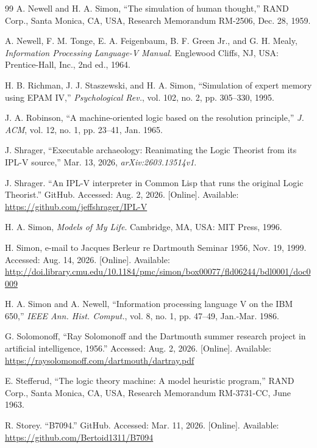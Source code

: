 \documentclass[journal]{IEEEtran}
\begin{document}
\begin{thebibliography}{99}
 A. Newell and H. A. Simon,
  ``The simulation of human thought,''
  RAND Corp., Santa Monica, CA, USA,
  Research Memorandum RM-2506, Dec. 28, 1959.

 A. Newell, F. M. Tonge, E. A. Feigenbaum,
  B. F. Green Jr., and G. H. Mealy,
  \textit{Information
  Processing Language-V Manual}. Englewood Cliffs, NJ, USA:
  Prentice-Hall, Inc., 2nd ed., 1964.

 H. B. Richman, J. J. Staszewski, and
  H. A. Simon, ``Simulation of expert memory using EPAM IV,''
  \textit{Psychological Rev.}, vol. 102, no. 2, pp. 305--330, 1995.

 J. A. Robinson,
  ``A machine-oriented logic based on the resolution principle,''
  \textit{J. ACM}, vol. 12, no. 1, pp. 23--41, Jan. 1965.

 J. Shrager,
  ``Executable archaeology: Reanimating the Logic Theorist
  from its IPL-V source,''
  Mar. 13, 2026, \textit{arXiv:2603.13514v1}.

 J. Shrager.
  ``An IPL-V interpreter in Common Lisp that runs the original Logic
  Theorist.''
  GitHub.
  Accessed: Aug. 2, 2026.  [Online].
  Available: \url{https://github.com/jeffshrager/IPL-V}

 H. A. Simon, \textit{Models of My Life}.
  Cambridge, MA, USA: MIT Press, 1996.

 H. Simon, e-mail to Jacques Berleur
  re Dartmouth Seminar 1956, Nov. 19, 1999.
  Accessed: Aug. 14, 2026.  [Online].
  Available: \url{http://doi.library.cmu.edu/10.1184/pmc/simon/box00077/fld06244/bdl0001/doc0009}

 H. A. Simon and A. Newell,
  ``Information processing language V on the IBM 650,''
  \textit{IEEE Ann. Hist. Comput.}, vol. 8, no. 1, pp. 47--49, Jan.-Mar. 1986.

 G. Solomonoff,
  ``Ray Solomonoff and the Dartmouth summer research project in
  artificial intelligence, 1956.''
  Accessed: Aug. 2, 2026.  [Online].
  Available: \url{https://raysolomonoff.com/dartmouth/dartray.pdf}

 E. Stefferud,
  ``The logic theory machine: A model heuristic program,''
  RAND Corp., Santa Monica, CA, USA, Research Memorandum RM-3731-CC, June 1963.

 R. Storey. ``B7094.''
  GitHub.
  Accessed: Mar. 11, 2026.  [Online].
  Available: \url{https://github.com/Bertoid1311/B7094}


\end{thebibliography}
\end{document}
